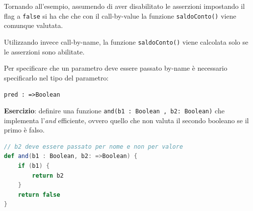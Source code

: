 Tornando all'esempio, assumendo di aver disabilitato le asserzioni impostando il flag a \texttt{false} si ha che che con il call-by-value la funzione \texttt{saldoConto()} viene comunque valutata.

Utilizzando invece call-by-name, la funzione \texttt{saldoConto()} viene calcolata solo se le asserzioni sono abilitate.

Per specificare che un parametro deve essere passato by-name è necessario specificarlo nel tipo del parametro:

\begin{center}
\texttt{pred : =>Boolean}
\end{center}

\textbf{Esercizio}: definire una funzione \texttt{and(b1 : Boolean , b2: Boolean)} che implementa l'\textit{and} efficiente, ovvero quello che non valuta il secondo booleano se il primo è falso.

\begin{lstlisting}[language=Scala]
// b2 deve essere passato per nome e non per valore
def and(b1 : Boolean, b2: =>Boolean) {
	if (b1) {
		return b2
	}
	return false
}
\end{lstlisting}

